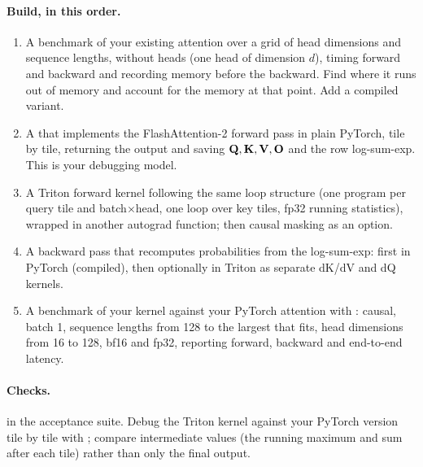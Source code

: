 \paragraph{Build, in this order.}
\begin{enumerate}
\item A benchmark of your existing attention over a grid of head dimensions and sequence lengths,
  without heads (one head of dimension $d$), timing forward and backward and recording memory before
  the backward. Find where it runs out of memory and account for the memory at that point. Add a
  compiled variant.
\item A  that implements the FlashAttention-2 forward pass in plain
  PyTorch, tile by tile, returning the output and saving $\mathbf{Q},\mathbf{K},\mathbf{V},\mathbf{O}$ and the
  row log-sum-exp. This is your debugging model.
\item A Triton forward kernel following the same loop structure (one program per query tile and
  batch$\times$head, one loop over key tiles, fp32 running statistics), wrapped in another autograd
  function; then causal masking as an option.
\item A backward pass that recomputes probabilities from the log-sum-exp: first in PyTorch (compiled),
  then optionally in Triton as separate dK/dV and dQ kernels.
\item A benchmark of your kernel against your PyTorch attention with :
  causal, batch 1, sequence lengths from 128 to the largest that fits, head dimensions from 16 to 128,
  bf16 and fp32, reporting forward, backward and end-to-end latency.
\end{enumerate}

\paragraph{Checks.}  in the acceptance suite. Debug the Triton kernel against your
PyTorch version tile by tile with ; compare intermediate values (the running
maximum and sum after each tile) rather than only the final output.

